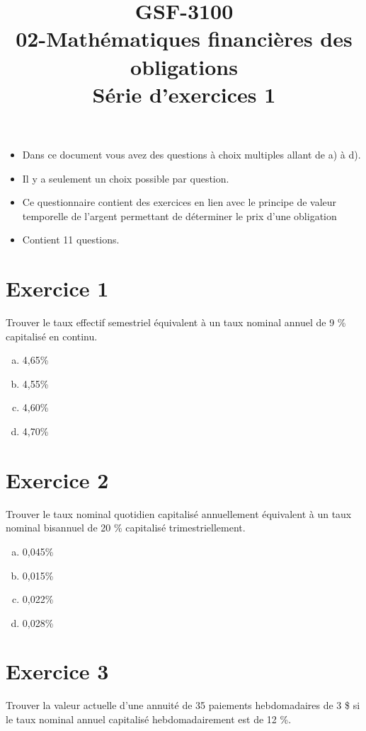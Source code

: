 \documentclass[10pt,a4paper]{article}
\title{GSF-3100 \\
02-Mathématiques financières des obligations \\
Série d'exercices 1}
\begin{document}
\maketitle

\begin{itemize}
\item Dans ce document vous avez des questions à choix multiples allant de a) à d).  
\item Il y a seulement un choix possible par question.
\item Ce questionnaire contient des exercices en lien avec le principe de valeur temporelle de l'argent permettant de déterminer le prix d'une obligation
\item Contient 11 questions. 
\end{itemize}
 

\newpage

\section*{Exercice 1}
Trouver le taux effectif semestriel équivalent à un taux nominal annuel de 9 \% capitalisé en continu.

\begin{enumerate}[a)]
\item 4,65\%
\item 4,55\%
\item 4,60\%
\item 4,70\%
\end{enumerate}


\section*{Exercice 2}
Trouver le taux nominal quotidien capitalisé annuellement équivalent à un taux nominal bisannuel de 20 \% capitalisé trimestriellement.

\begin{enumerate}[a)]
\item 0,045\%
\item 0,015\%
\item 0,022\%
\item 0,028\%
\end{enumerate}


\section*{Exercice 3}
Trouver la valeur actuelle d’une annuité de 35 paiements hebdomadaires de 3 \$ si le taux nominal annuel capitalisé hebdomadairement est de 12 \%.
\end{document}
